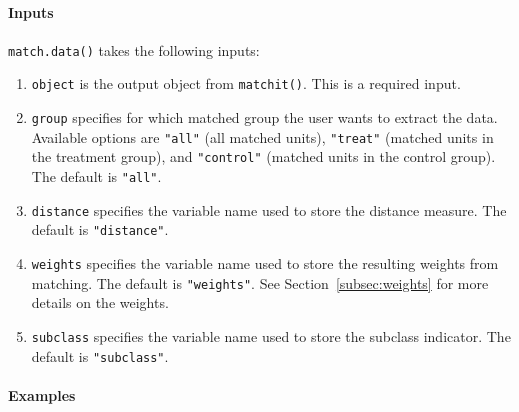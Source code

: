 \documentclass[oneside,letterpaper,titlepage]{article}
\begin{document}
\paragraph{Inputs}

{\tt match.data()} takes the following inputs:
\begin{enumerate}
\item {\tt object} is the output object from {\tt matchit()}. This is
  a required input.
\item {\tt group} specifies for which matched group the user wants to
  extract the data. Available options are {\tt "all"} (all matched
  units), {\tt "treat"} (matched units in the treatment group), and
  {\tt "control"} (matched units in the control group). The default is
  {\tt "all"}.
\item {\tt distance} specifies the variable name used to store the
  distance measure. The default is {\tt "distance"}.
\item {\tt weights} specifies the variable name used to store the
  resulting weights from matching. The default is {\tt "weights"}. See
  Section~\ref{subsec:weights} for more details on the weights.
\item {\tt subclass} specifies the variable name used to store the
  subclass indicator. The default is {\tt "subclass"}.
\end{enumerate}

\paragraph{Examples}
\end{document}
